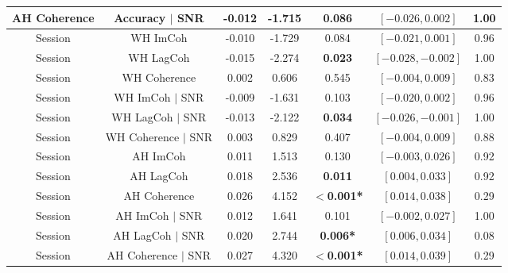 {\begin{tabular}{ccccccc}
AH Coherence & Accuracy $|$ SNR & -0.012 & -1.715 & 0.086 & $[-0.026, 0.002]$ & 1.00\\
\midrule
Session & WH ImCoh & -0.010 & -1.729 & 0.084 & $[-0.021, 0.001]$ & 0.96\\
Session & WH LagCoh & -0.015 & -2.274 & \textbf{0.023} & $[-0.028,-0.002]$ & 1.00\\
Session & WH Coherence & 0.002 & 0.606 & 0.545 & $[-0.004, 0.009]$ & 0.83\\
\addlinespace
Session & WH ImCoh $|$ SNR & -0.009 & -1.631 & 0.103 & $[-0.020, 0.002]$ & 0.96\\
Session & WH LagCoh $|$ SNR & -0.013 & -2.122 & \textbf{0.034} & $[-0.026,-0.001]$ & 1.00\\
Session & WH Coherence $|$ SNR & 0.003 & 0.829 & 0.407 & $[-0.004, 0.009]$ & 0.88\\
\addlinespace
Session & AH ImCoh & 0.011 & 1.513 & 0.130 & $[-0.003, 0.026]$ & 0.92\\
Session & AH LagCoh & 0.018 & 2.536 & \textbf{0.011} & $[ 0.004, 0.033]$ & 0.92\\
Session & AH Coherence & 0.026 & 4.152 & \textbf{$<$0.001*} & $[ 0.014, 0.038]$ & 0.29\\
\addlinespace
Session & AH ImCoh $|$ SNR & 0.012 & 1.641 & 0.101 & $[-0.002, 0.027]$ & 1.00\\
Session & AH LagCoh $|$ SNR & 0.020 & 2.744 & \textbf{0.006*} & $[ 0.006, 0.034]$ & 0.08\\
Session & AH Coherence $|$ SNR & 0.027 & 4.320 & \textbf{$<$0.001*} & $[ 0.014, 0.039]$ & 0.29\\
\bottomrule
\end{tabular}}
